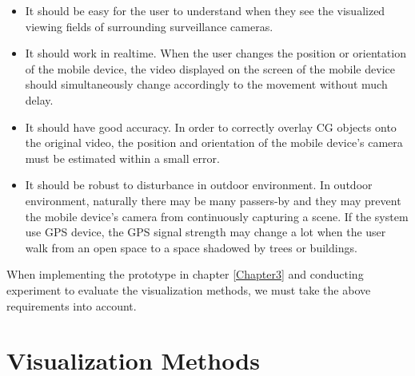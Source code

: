 \begin{itemize}
	\item It should be easy for the user to understand when they see the visualized viewing fields of surrounding surveillance cameras.
	\item It should work in realtime. When the user changes the position or orientation of the mobile device, the video displayed on the screen of the mobile device should simultaneously change accordingly to the movement without much delay.
	\item It should have good accuracy. In order to correctly overlay CG objects onto the original video, the position and orientation of the mobile device's camera must be estimated within a small error.
	\item It should be robust to disturbance in outdoor environment. In outdoor environment, naturally there may be many passers-by and they may prevent the mobile device's camera from continuously capturing a scene. If the system use GPS device, the GPS signal strength may change a lot when the user walk from an open space to a space shadowed by trees or buildings.
\end{itemize}

When implementing the prototype in chapter \ref{Chapter3} and conducting experiment to evaluate the visualization methods, we must take the above requirements into account.


\section{Visualization Methods}
\label{VisualizationMethods}

